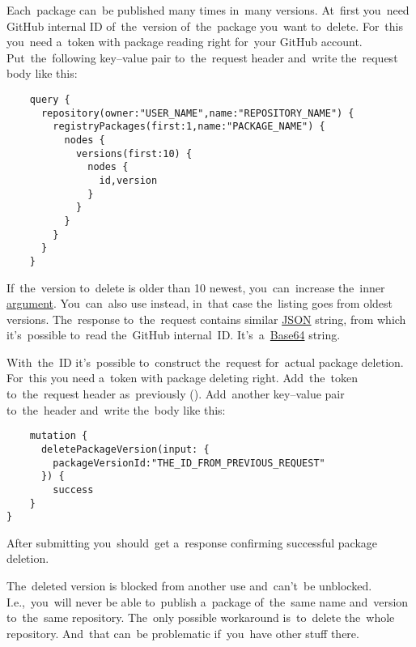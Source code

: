 Each~package can~be published many times in~many versions.
At~first you~need GitHub internal ID of~the~version of~the~package you~want to~delete.
For~this you~need a~token with package reading right for~your GitHub account.
Put~the~following key--value pair  to~the~request header and~write the~request body like this:
\begin{lstlisting}
    query {
      repository(owner:"USER_NAME",name:"REPOSITORY_NAME") {
        registryPackages(first:1,name:"PACKAGE_NAME") {
          nodes {
            versions(first:10) {
              nodes {
                id,version
              }
            }
          }
        }
      }
    }
\end{lstlisting}

\noindent If~the~version to~delete is older than 10 newest, you~can~increase the~inner  \hyperref[parameterargument]{argument}.
You~can~also use  instead, in~that case the~listing goes from oldest versions.
The~response to~the~request contains similar \hyperref[json]{JSON} string, from which it's~possible to~read the~GitHub internal~ID\@.
It's~a~\hyperref[base64]{Base64} string.

With~the~ID it's~possible to~construct the~request for~actual package deletion.
For~this you need a~token with package deleting right.
Add~the~token to~the~request header as~previously ().
Add~another key--value pair  to~the~header and~write the~body like this:
\begin{lstlisting}
    mutation {
      deletePackageVersion(input: {
        packageVersionId:"THE_ID_FROM_PREVIOUS_REQUEST"
      }) {
        success
    }
}
\end{lstlisting}

\noindent After submitting you~should~get a~response confirming successful package deletion.

\warning The~deleted version is blocked from another use and~can't~be unblocked.
I.e.,~you~will never be able to~publish a~package of~the~same name and~version to~the~same repository.
The~only possible workaround is~to~delete the~whole repository.
And~that can~be problematic if~you~have other stuff there.
